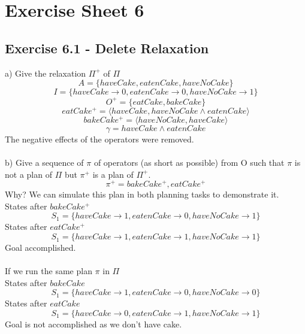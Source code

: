 \documentclass[12pt,a4paper]{article}
\begin{document}
	\section*{Exercise Sheet 6}
	\subsection*{Exercise 6.1 - Delete Relaxation}
	a) Give the relaxation $\Pi^+$ of $\Pi$
	\[A = \lbrace haveCake, eatenCake, haveNoCake \rbrace \]
	\[I = \lbrace haveCake \rightarrow 0, eatenCake \rightarrow 0, haveNoCake \rightarrow 1 \rbrace \]
	\[ O^+ = \lbrace eatCake, bakeCake \rbrace \]
	\[eatCake^+ = \langle  haveCake, haveNoCake \land eatenCake \rangle \]
	\[bakeCake^+ = \langle  haveNoCake, haveCake \rangle \]
	\[\gamma = haveCake \land eatenCake \]
	The negative effects of the operators were removed.\\\\
	b) Give a sequence of $\pi$ of operators (as short as possible) from O such that $\pi$ is not a plan of $\Pi$ but $\pi^+$ is a plan of $\Pi^+$.\\
	\[ \pi^+ = bakeCake^+, eatCake^+ \]
	Why? We can simulate this plan in both planning tasks to demonstrate it.\\
	States after $bakeCake^+$ 	
	\[S_1 = \lbrace haveCake \rightarrow 1, eatenCake \rightarrow 0, haveNoCake \rightarrow 1 \rbrace \]
	States after $eatCake^+$ 	
	\[S_1 = \lbrace haveCake \rightarrow 1, eatenCake \rightarrow 1, haveNoCake \rightarrow 1 \rbrace \]
	Goal accomplished. \\\\
	If we run the same plan $\pi$ in $\Pi$\\
	States after $bakeCake$ 	
	\[S_1 = \lbrace haveCake \rightarrow 1, eatenCake \rightarrow 0, haveNoCake \rightarrow 0 \rbrace \]
	States after $eatCake$ 	
	\[S_1 = \lbrace haveCake \rightarrow 0, eatenCake \rightarrow 1, haveNoCake \rightarrow 1 \rbrace \]
	Goal is not accomplished as we don't have cake.
\end{document}
